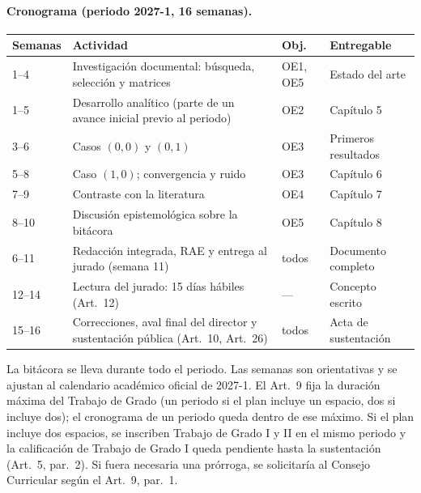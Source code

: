 \documentclass[12pt,letterpaper]{article}
\begin{document}
\paragraph{Cronograma (periodo 2027-1, 16 semanas).}
\begin{center}
\begin{tabular}{@{}p{1.8cm} p{7.4cm} p{1.4cm} p{3.2cm}@{}}
\toprule
\textbf{Semanas} & \textbf{Actividad} & \textbf{Obj.} & \textbf{Entregable} \\
\midrule
1--4 & Investigación documental: búsqueda, selección y matrices & OE1, OE5 & Estado del arte \\
1--5 & Desarrollo analítico (parte de un avance inicial previo al periodo) & OE2 & Capítulo 5 \\
3--6 & Casos $(0,0)$ y $(0,1)$ & OE3 & Primeros resultados \\
5--8 & Caso $(1,0)$; convergencia y ruido & OE3 & Capítulo 6 \\
7--9 & Contraste con la literatura & OE4 & Capítulo 7 \\
8--10 & Discusión epistemológica sobre la bitácora & OE5 & Capítulo 8 \\
6--11 & Redacción integrada, RAE y entrega al jurado (semana 11) & todos & Documento completo \\
12--14 & Lectura del jurado: 15 días hábiles (Art.~12) & --- & Concepto escrito \\
15--16 & Correcciones, aval final del director y sustentación pública (Art.~10, Art.~26) & todos & Acta de sustentación \\
\bottomrule
\end{tabular}
\end{center}
La bitácora se lleva durante todo el periodo. Las semanas son orientativas y se ajustan al calendario académico
oficial de 2027-1. El Art.~9 fija la duración máxima del Trabajo de Grado (un periodo si el plan incluye un espacio,
dos si incluye dos); el cronograma de un periodo queda dentro de ese máximo. Si el plan incluye dos espacios, se
inscriben Trabajo de Grado I y II en el mismo periodo y la calificación de Trabajo de Grado I queda pendiente hasta la
sustentación (Art.~5, par.~2). Si fuera necesaria una prórroga, se solicitaría al Consejo Curricular según el Art.~9,
par.~1.

\end{document}
